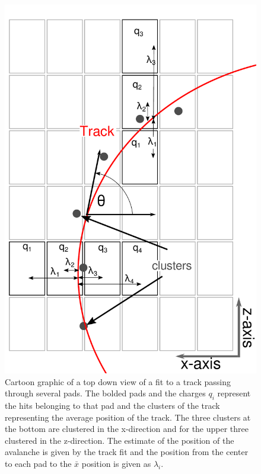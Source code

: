 \documentclass[review]{elsarticle}
\begin{document}
\begin{figure}[H]
\includegraphics[scale=.5]{top_view_helix_ext.pdf}
\caption{Cartoon graphic of a top down view of a fit to a track passing through several pads. The bolded pads and the charges $q_i$ represent the hits belonging to that pad and the clusters of the track representing the average position of the track. The three clusters at the bottom are clustered in the x-direction and for the upper three clustered in the z-direction. The estimate of the position of the avalanche is given by the track fit and the position from the center to each pad to the $\bar{x}$ position is given as $\lambda_i$.}
\label{fig:topview}
\end{figure}
\end{document}
